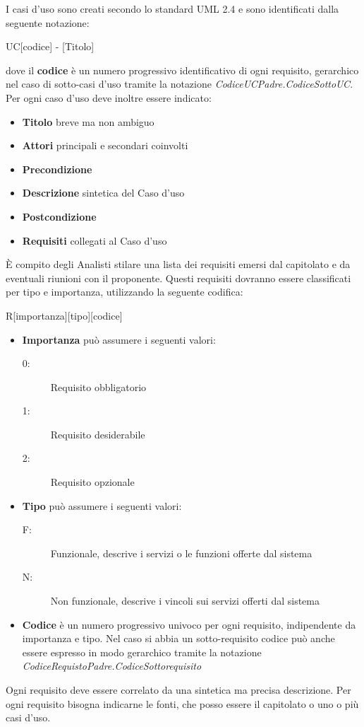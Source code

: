 \documentclass[12pt,a4paper]{article}
\begin{document}
I casi d'uso sono creati secondo lo standard UML 2.4 e sono identificati dalla seguente notazione:
\begin{center}
	UC[codice] - [Titolo]
\end{center}
dove il \textbf{codice} è un numero progressivo identificativo di ogni requisito, gerarchico nel  caso di sotto-casi d'uso tramite la notazione \textit{CodiceUCPadre.CodiceSottoUC}. Per ogni caso d'uso deve inoltre essere indicato:
\begin{itemize}
	\item \textbf{Titolo} breve ma non ambiguo
	\item \textbf{Attori} principali e secondari coinvolti
	\item \textbf{Precondizione}
	\item \textbf{Descrizione} sintetica del Caso d'uso
	\item \textbf{Postcondizione}
	\item \textbf{Requisiti} collegati al Caso d'uso
\end{itemize}

È compito degli Analisti stilare una lista dei requisiti emersi dal capitolato e da eventuali riunioni con il proponente. Questi requisiti dovranno essere classificati per tipo e importanza, utilizzando la seguente codifica:
\begin{center}
	R[importanza][tipo][codice]
\end{center}
\begin{itemize}
	\item \textbf{Importanza} può assumere i seguenti valori:
	\begin{description}
		\item[0:] Requisito obbligatorio
		\item[1:] Requisito desiderabile
		\item[2:] Requisito opzionale
	\end{description}
\end{itemize}
\begin{itemize}
	\item \textbf{Tipo} può assumere i seguenti valori:
	\begin{description}
		\item[F:] Funzionale, descrive i servizi o le funzioni offerte dal sistema
		\item[N:] Non funzionale, descrive i vincoli sui servizi offerti dal sistema
	\end{description}
\end{itemize}
\begin{itemize}
	\item \textbf{Codice} è un numero progressivo univoco per ogni requisito, indipendente da importanza e tipo. Nel caso si abbia un sotto-requisito codice può anche essere espresso in modo gerarchico tramite la notazione \textit{CodiceRequistoPadre.CodiceSottorequisito}
\end{itemize}
Ogni requisito deve essere correlato da una sintetica ma precisa descrizione. Per ogni requisito bisogna indicarne le fonti, che posso essere il capitolato o uno o più casi d'uso.
\end{document}
